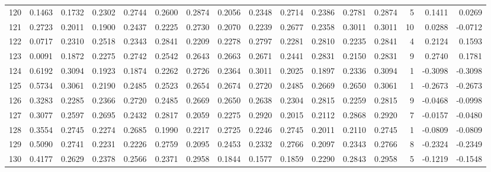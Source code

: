 \begin{tabular}{lrrrrrrrrrrrrrrr}
120 &      0.1463 &  0.1732 &  0.2302 &  0.2744 &  0.2600 &  0.2874 &  0.2056 &  0.2348 &  0.2714 &  0.2386 &   0.2781 &     0.2874 &      5 &                    0.1411 &                     0.0269 \\
121 &      0.2723 &  0.2011 &  0.1900 &  0.2437 &  0.2225 &  0.2730 &  0.2070 &  0.2239 &  0.2677 &  0.2358 &   0.3011 &     0.3011 &     10 &                    0.0288 &                    -0.0712 \\
122 &      0.0717 &  0.2310 &  0.2518 &  0.2343 &  0.2841 &  0.2209 &  0.2278 &  0.2797 &  0.2281 &  0.2810 &   0.2235 &     0.2841 &      4 &                    0.2124 &                     0.1593 \\
123 &      0.0091 &  0.1872 &  0.2275 &  0.2742 &  0.2542 &  0.2643 &  0.2663 &  0.2671 &  0.2441 &  0.2831 &   0.2150 &     0.2831 &      9 &                    0.2740 &                     0.1781 \\
124 &      0.6192 &  0.3094 &  0.1923 &  0.1874 &  0.2262 &  0.2726 &  0.2364 &  0.3011 &  0.2025 &  0.1897 &   0.2336 &     0.3094 &      1 &                   -0.3098 &                    -0.3098 \\
125 &      0.5734 &  0.3061 &  0.2190 &  0.2485 &  0.2523 &  0.2654 &  0.2674 &  0.2720 &  0.2485 &  0.2669 &   0.2650 &     0.3061 &      1 &                   -0.2673 &                    -0.2673 \\
126 &      0.3283 &  0.2285 &  0.2366 &  0.2720 &  0.2485 &  0.2669 &  0.2650 &  0.2638 &  0.2304 &  0.2815 &   0.2259 &     0.2815 &      9 &                   -0.0468 &                    -0.0998 \\
127 &      0.3077 &  0.2597 &  0.2695 &  0.2432 &  0.2817 &  0.2059 &  0.2275 &  0.2920 &  0.2015 &  0.2112 &   0.2868 &     0.2920 &      7 &                   -0.0157 &                    -0.0480 \\
128 &      0.3554 &  0.2745 &  0.2274 &  0.2685 &  0.1990 &  0.2217 &  0.2725 &  0.2246 &  0.2745 &  0.2011 &   0.2110 &     0.2745 &      1 &                   -0.0809 &                    -0.0809 \\
129 &      0.5090 &  0.2741 &  0.2231 &  0.2226 &  0.2759 &  0.2095 &  0.2453 &  0.2332 &  0.2766 &  0.2097 &   0.2343 &     0.2766 &      8 &                   -0.2324 &                    -0.2349 \\
130 &      0.4177 &  0.2629 &  0.2378 &  0.2566 &  0.2371 &  0.2958 &  0.1844 &  0.1577 &  0.1859 &  0.2290 &   0.2843 &     0.2958 &      5 &                   -0.1219 &                    -0.1548 \\

\end{tabular}
